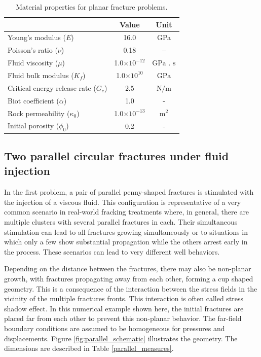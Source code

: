 \begin{table}[h]
  \centering
  \caption{Material properties for planar fracture problems.}
  \begin{tabular}[t]{lcc}
  \hline
  &Value &Unit \\
  \hline
  Young's modulus ($E$)&16.0&GPa\\
  Poisson's ratio ($\nu$)&0.18&--\\
  Fluid viscosity ($\mu$)&1.0$\times10^{-12}$&$\text{GPa . s}$\\
  Fluid bulk modulus ($K_f$)&1.0$\times10^{10}$&$\text{GPa}$\\
  Critical energy release rate ($G_c$)&2.5&$\text{N/m}$\\
  Biot coefficient ($\alpha$)&1.0&$\text{ - }$\\
  Rock permeability ($\kappa_0$)&1.0$\times 10^{-13}$&$\text{m}^2$\\
  Initial porosity ($\phi_0$)&0.2&$\text{-}$\\
  \hline
  \end{tabular}
  \label{material properties ch4}
\end{table}%

\subsection{Two parallel circular fractures under fluid injection}

In the first problem, a pair of parallel penny-shaped fractures is stimulated with the injection of a viscous fluid. This configuration is representative of a very common scenario in real-world fracking treatments where, in general, there are multiple clusters with several parallel fractures in each. Their simultaneous stimulation can lead to all fractures growing simultaneously or to situations in which only a few show substantial propagation while the others arrest early in the process. These scenarios can lead to very different well behaviors.   

Depending on the distance between the fractures, there may also be non-planar growth, with fractures propagating away from each other, forming a cup shaped geometry. This is a consequence of the interaction between the stress fields in the vicinity of the multiple fractures fronts. This interaction is often called stress shadow effect. In this numerical example shown here, the initial fractures are placed far from each other to prevent this non-planar behavior. The far-field boundary conditions are assumed to be homogeneous for pressures and displacements. Figure \ref{fig:parallel_schematic} illustrates the geometry. The dimensions are described in Table \ref{parallel_measures}.

